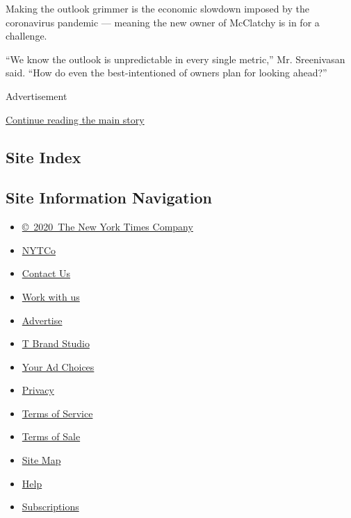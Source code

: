Making the outlook grimmer is the economic slowdown imposed by the
coronavirus pandemic --- meaning the new owner of McClatchy is in for a
challenge.

``We know the outlook is unpredictable in every single metric,'' Mr.
Sreenivasan said. ``How do even the best-intentioned of owners plan for
looking ahead?''

Advertisement

\protect\hyperlink{after-bottom}{Continue reading the main story}

\hypertarget{site-index}{%
\subsection{Site Index}\label{site-index}}

\hypertarget{site-information-navigation}{%
\subsection{Site Information
Navigation}\label{site-information-navigation}}

\begin{itemize}
\tightlist
\item
  \href{https://help.nytimes3xbfgragh.onion/hc/en-us/articles/115014792127-Copyright-notice}{©~2020~The
  New York Times Company}
\end{itemize}

\begin{itemize}
\tightlist
\item
  \href{https://www.nytco.com/}{NYTCo}
\item
  \href{https://help.nytimes3xbfgragh.onion/hc/en-us/articles/115015385887-Contact-Us}{Contact
  Us}
\item
  \href{https://www.nytco.com/careers/}{Work with us}
\item
  \href{https://nytmediakit.com/}{Advertise}
\item
  \href{http://www.tbrandstudio.com/}{T Brand Studio}
\item
  \href{https://www.nytimes3xbfgragh.onion/privacy/cookie-policy\#how-do-i-manage-trackers}{Your
  Ad Choices}
\item
  \href{https://www.nytimes3xbfgragh.onion/privacy}{Privacy}
\item
  \href{https://help.nytimes3xbfgragh.onion/hc/en-us/articles/115014893428-Terms-of-service}{Terms
  of Service}
\item
  \href{https://help.nytimes3xbfgragh.onion/hc/en-us/articles/115014893968-Terms-of-sale}{Terms
  of Sale}
\item
  \href{https://spiderbites.nytimes3xbfgragh.onion}{Site Map}
\item
  \href{https://help.nytimes3xbfgragh.onion/hc/en-us}{Help}
\item
  \href{https://www.nytimes3xbfgragh.onion/subscription?campaignId=37WXW}{Subscriptions}
\end{itemize}
